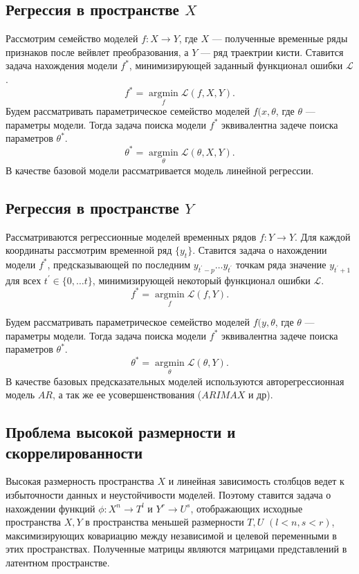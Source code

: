 \documentclass{article}
\newcommand{\argmin}{\mathop{\arg \min}\limits}
\begin{document}
\subsection{Регрессия в пространстве $X$}
Рассмотрим семейство моделей $f: X \rightarrow Y$, где $X$ --- полученные временные ряды признаков после вейвлет преобразования, а $Y$ --- ряд траектрии кисти. Ставится задача нахождения модели $f^*$,  минимизирующей заданный функционал ошибки $\mathcal{L}$.
\begin{equation}
	f^* = \argmin_f \mathcal{L}(f, X, Y).
\end{equation}
Будем рассматривать параметрическое семейство моделей $f(x, \theta$, где $\theta$ --- параметры модели. Тогда задача поиска модели $f^*$ эквивалентна задече поиска параметров $\theta^*$.
\begin{equation}
\theta^* = \argmin_{\theta} \mathcal{L}(\theta, X, Y).
\end{equation}
В качестве базовой модели рассматривается модель линейной регрессии.
\subsection{Регрессия в пространстве $Y$}
Рассматриваются регрессионные моделей временных рядов $f : Y \rightarrow Y$. Для каждой координаты рассмотрим временной ряд $\{y_t\}$. Ставится задача о нахождении модели $f^*$, предсказывающей по последним $y_{t^{'}-p} \dots y_{t^{'}}$ точкам ряда значение $y_{t^{'}+1}$ для всех $t^{'} \in \{0, \dots t\}$, минимизирующей некоторый функционал ошибки $ \mathcal{L}$.
\begin{equation}
	f^* = \argmin_f \mathcal{L}(f, Y).
\end{equation}

Будем рассматривать параметрическое семейство моделей $f(y, \theta$, где $\theta$ --- параметры модели. Тогда задача поиска модели $f^*$ эквивалентна задече поиска параметров $\theta^*$.
\begin{equation}
\theta^* = \argmin_{\theta} \mathcal{L}(\theta, Y).
\end{equation}
В качестве базовых предсказательных моделей используются авторегрессионная модель $AR$, а так же ее усовершенствования ($ARIMAX $ и др).
\subsection{Проблема высокой размерности и скоррелированности}
Высокая размерность пространства $X$ и линейная зависимость столбцов ведет к избыточности данных и неустойчивости моделей. Поэтому ставится задача о нахождении функций $\phi: X^n \rightarrow T^l$ и  $Y^r \rightarrow U^s$, отображающих исходные пространства $X, Y$ в пространства меньшей размерности $T, U$ $(l < n, s < r)$, максимизирующих ковариацию между независимой и целевой переменными в этих пространствах. Полученные матрицы являются матрицами представлений в латентном пространстве.
\end{document}
